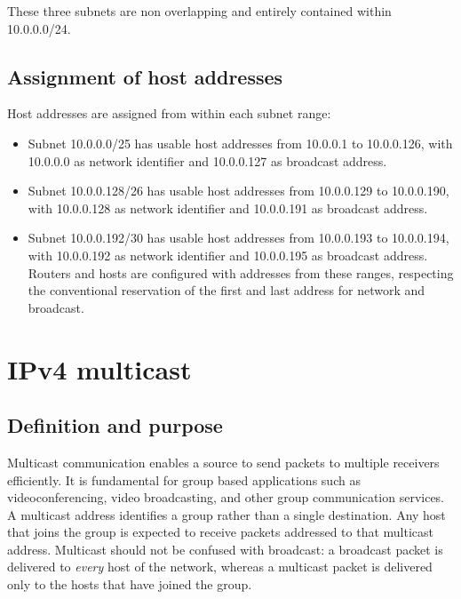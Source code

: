 These three subnets are non overlapping and entirely contained within 10.0.0.0/24.

\subsection{Assignment of host addresses}

Host addresses are assigned from within each subnet range:

\begin{itemize}
\item Subnet 10.0.0.0/25 has usable host addresses from 10.0.0.1 to 10.0.0.126, with 10.0.0.0 as network identifier and 10.0.0.127 as broadcast address.
\item Subnet 10.0.0.128/26 has usable host addresses from 10.0.0.129 to 10.0.0.190, with 10.0.0.128 as network identifier and 10.0.0.191 as broadcast address.
\item Subnet 10.0.0.192/30 has usable host addresses from 10.0.0.193 to 10.0.0.194, with 10.0.0.192 as network identifier and 10.0.0.195 as broadcast address. Routers and hosts are configured with addresses from these ranges, respecting the conventional reservation of the first and last address for network and broadcast.
\end{itemize}

\section{IPv4 multicast}

\subsection{Definition and purpose}

Multicast communication enables a source to send packets to multiple receivers efficiently. It is fundamental for group based applications such as videoconferencing, video broadcasting, and other group communication services. A multicast address identifies a group rather than a single destination. Any host that joins the group is expected to receive packets addressed to that multicast address.
Multicast should not be confused with broadcast: a broadcast packet is
delivered to \emph{every} host of the network, whereas a multicast packet is
delivered only to the hosts that have joined the group.
\begin{center}
\end{center}

